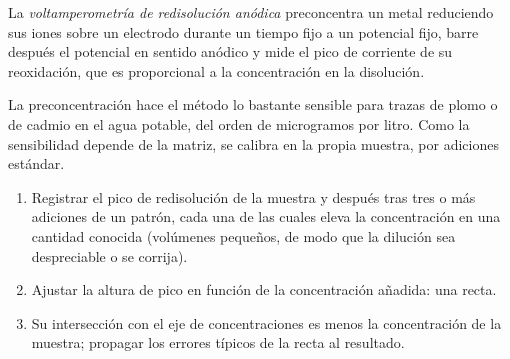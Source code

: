 \begin{definition}\label{def:b3:electrode-kinetics:stripping}
La \emph{voltamperometría de redisolución anódica}
preconcentra un metal reduciendo sus iones sobre un electrodo durante un tiempo fijo
a un potencial fijo, barre después el potencial en sentido anódico y mide el
pico de corriente de su reoxidación, que es proporcional a la concentración
en la disolución.
\end{definition}

La preconcentración hace el método lo bastante sensible para trazas de plomo o de
cadmio en el agua potable, del orden de microgramos por litro. Como la
sensibilidad depende de la matriz, se calibra en la propia muestra, por
adiciones estándar.

\begin{method}\label{met:b3:electrode-kinetics:standard-addition}
\begin{enumerate}
  \item Registrar el pico de redisolución de la muestra y después tras tres o más
        adiciones de un patrón, cada una de las cuales eleva la concentración en una cantidad
        conocida (volúmenes pequeños, de modo que la dilución sea despreciable o se corrija).
  \item Ajustar la altura de pico en función de la concentración añadida: una recta.
  \item Su intersección con el eje de concentraciones es menos la concentración de la
        muestra; propagar los errores típicos de la recta al resultado.
\end{enumerate}
\end{method}

